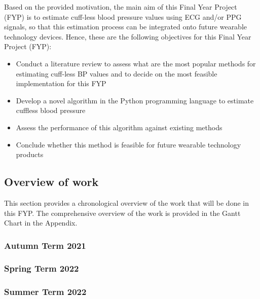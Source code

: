 Based on the provided motivation, the main aim of this Final Year Project (FYP) is to estimate 
cuff-less blood pressure values using ECG and/or PPG signals, so that this estimation process 
can be integrated onto future wearable technology devices. Hence, these are the following objectives 
for this Final Year Project (FYP):

\begin{itemize}
    \item Conduct a literature review to assess what are the most popular methods for estimating cuff-less BP values and to decide on the most feasible implementation for this FYP\\
    \item Develop a novel algorithm in the Python programming language to estimate cuffless blood pressure\\
    \item Assess the performance of this algorithm against existing methods\\
    \item Conclude whether this method is feasible for future wearable technology products
\end{itemize}

\subsection{Overview of work}
This section provides a chronological overview of the work that will be done in this FYP. The comprehensive overview 
of the work is provided in the Gantt Chart in the Appendix.

\subsubsection{Autumn Term 2021}

\subsubsection{Spring Term 2022}

\subsubsection{Summer Term 2022}


